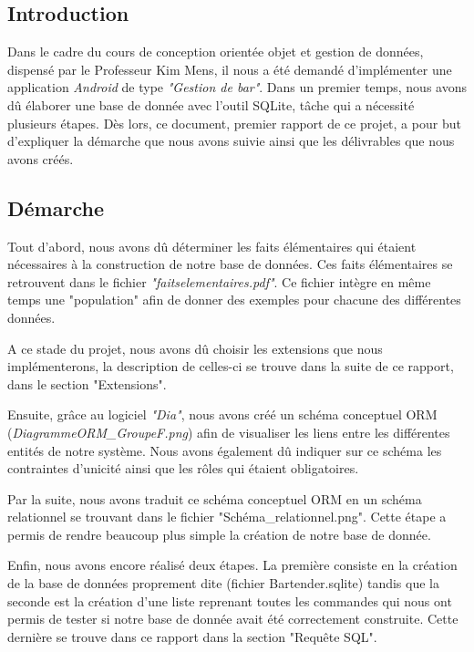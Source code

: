\documentclass[11pt, a4, oneside, headings=normal]{scrreprt}
\begin{document}


\subsection*{Introduction}

Dans le cadre du cours de conception orientée objet et gestion de données, dispensé par le Professeur Kim Mens, il nous a été demandé d'implémenter une application \textit{Android} de type \textit{"Gestion de bar"}. Dans un premier temps, nous avons dû élaborer une base de donnée avec l'outil SQLite, tâche qui a nécessité plusieurs étapes. Dès lors, ce document, premier rapport de ce projet, a pour but d'expliquer la démarche que nous avons suivie ainsi que les délivrables que nous avons créés.

\subsection*{Démarche}

Tout d'abord, nous avons dû déterminer les faits élémentaires qui étaient nécessaires à la construction de notre base de données. Ces faits élémentaires se retrouvent dans le fichier \textit{"faitselementaires.pdf"}. Ce fichier intègre en même temps une "population" afin de donner des exemples pour chacune des différentes données.

A ce stade du projet, nous avons dû choisir les extensions que nous implémenterons, la description de celles-ci se trouve dans la suite de ce rapport, dans le section "Extensions".

Ensuite, grâce au logiciel \textit{"Dia"}, nous avons créé un schéma conceptuel ORM (\textit{DiagrammeORM\_GroupeF.png}) afin de visualiser les liens entre les différentes entités de notre système. Nous avons également dû indiquer sur ce schéma les contraintes d'unicité ainsi que les rôles qui étaient obligatoires.

Par la suite, nous avons traduit ce schéma conceptuel ORM en un schéma relationnel se trouvant dans le fichier "Schéma\_relationnel.png". Cette étape a permis de rendre beaucoup plus simple la création de notre base de donnée.

Enfin, nous avons encore réalisé deux étapes. La première consiste en la création de la base de données proprement dite (fichier Bartender.sqlite) tandis que la seconde est la création d'une liste reprenant toutes les commandes qui nous ont permis de tester si notre base de donnée avait été correctement construite. Cette dernière se trouve dans ce rapport dans la section "Requête SQL".
\end{document}
